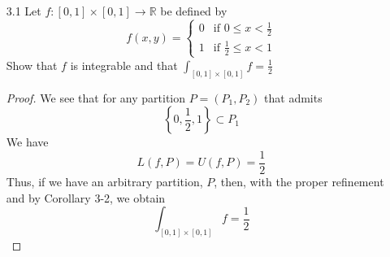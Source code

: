 \begin{enumerate}
    \item[3.1] Let \( f: [0,1] \times [0,1] \rightarrow \mathbb{R} \) be defined by 
    \[
    f(x,y) = \begin{cases} 0 & \text{if } 0 \leq x < \frac{1}{2} \\ 1 & \text{if } \frac{1}{2} \leq x < 1 \end{cases}
    \]
    Show that \( f \) is integrable and that \( \int_{[0,1] \times [0,1]} f = \frac{1}{2} \)
    
    \begin{proof}
    We see that for any partition \( P = (P_1,P_2) \) that admits
    \[
    \left\{0, \frac{1}{2}, 1 \right\} \subset P_1
    \]
    We have
    \[
    L(f,P) = U(f,P) = \frac{1}{2}
    \]
    Thus, if we have an arbitrary partition, \( P \), then, with the proper refinement and by Corollary 3-2, we obtain
    \[
    \int_{[0,1]\times[0,1]} f = \frac{1}{2}
    \]
    \end{proof}
    

\end{enumerate}
